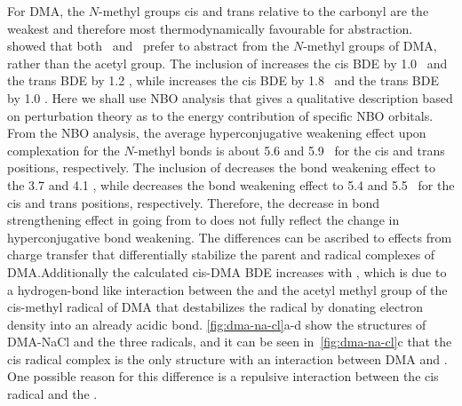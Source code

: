For DMA, the $N$-methyl groups cis and trans relative to the carbonyl are the
weakest and therefore most thermodynamically favourable for abstraction.
\citet{Salamone2013} showed that both \bno\ and \cumo\ prefer to abstract from
the $N$-methyl groups of DMA, rather than the acetyl group. The inclusion of
 increases the cis BDE by 1.0 \kcalmol\ and the trans BDE by 1.2
\kcalmol, while  increases the cis BDE by 1.8 \kcalmol\ and the trans
BDE by 1.0 \kcalmol. Here we shall use NBO analysis that gives a qualitative
description based on perturbation theory as to the energy contribution of
specific NBO orbitals.\cite{Weinhold2016} From the NBO analysis, the average
hyperconjugative weakening effect upon complexation for the $N$-methyl 
bonds is about 5.6 and 5.9 \kcalmol\ for the cis and trans positions,
respectively. The inclusion of  decreases the bond weakening effect to
the 3.7 and 4.1 \kcalmol, while  decreases the bond weakening effect to
5.4 and 5.5 \kcalmol\ for the cis and trans positions, respectively. Therefore,
the decrease in bond strengthening effect in going from  to 
does not fully reflect the change in hyperconjugative bond weakening. The
differences can be ascribed to effects from charge transfer that differentially
stabilize the parent and radical complexes of DMA.\@ Additionally the calculated
cis-DMA BDE increases with , which is due to a hydrogen-bond like
interaction between the  and the acetyl methyl group of the cis-methyl
radical of DMA that destabilizes the radical by donating electron density into
an already acidic  bond. \ref{fig:dma-na-cl}a-d show the structures of
DMA-NaCl and the three radicals, and it can be seen in~\ref{fig:dma-na-cl}c that
the cis radical complex is the only structure with an interaction between DMA
and .  One possible reason for this difference is a repulsive
interaction between the cis radical and the .

